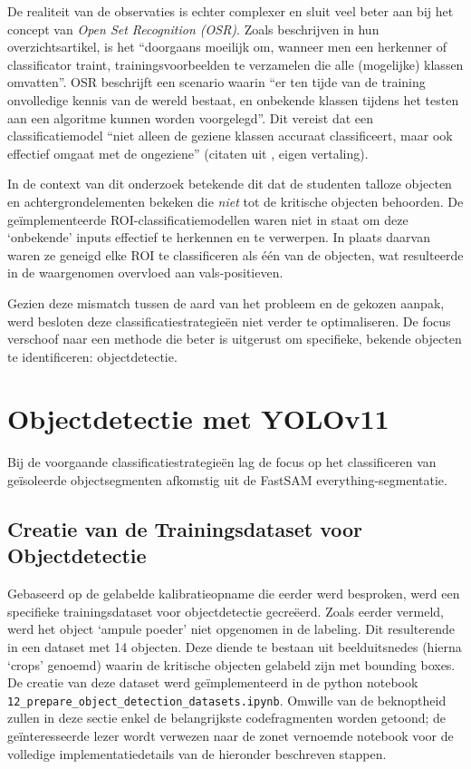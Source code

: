 De realiteit van de observaties is echter complexer en sluit veel beter aan bij het concept van \textit{Open Set Recognition (OSR)}. 
Zoals \textcite{Geng2018} beschrijven in hun overzichtsartikel, is het 
``doorgaans moeilijk om, wanneer men een herkenner of classificator traint, trainingsvoorbeelden te verzamelen die alle (mogelijke) klassen omvatten''.
OSR beschrijft een scenario waarin 
``er ten tijde van de training onvolledige kennis van de wereld bestaat, en onbekende klassen tijdens het testen aan een algoritme kunnen worden voorgelegd''.
Dit vereist dat een classificatiemodel ``niet alleen de geziene klassen accuraat classificeert, maar ook effectief omgaat met de ongeziene'' (citaten uit \textcite{Geng2018}, eigen vertaling).

In de context van dit onderzoek betekende dit dat de studenten talloze objecten en achtergrondelementen bekeken die \textit{niet} tot de kritische objecten behoorden.
De geïmplementeerde ROI-classificatiemodellen waren niet in staat om deze `onbekende' inputs effectief te herkennen en te verwerpen.
In plaats daarvan waren ze geneigd elke ROI te classificeren als één van de objecten, wat resulteerde in de waargenomen overvloed aan vals-positieven.

Gezien deze mismatch tussen de aard van het probleem en de gekozen aanpak, werd besloten deze classificatiestrategieën niet verder te optimaliseren.
De focus verschoof naar een methode die beter is uitgerust om specifieke, bekende objecten te identificeren: objectdetectie.

\section{Objectdetectie met YOLOv11} 

Bij de voorgaande classificatiestrategieën lag de focus op het classificeren van geïsoleerde objectsegmenten afkomstig uit de FastSAM everything-segmentatie.

\subsection{Creatie van de Trainingsdataset voor Objectdetectie}

Gebaseerd op de gelabelde kalibratieopname die eerder werd besproken, werd een specifieke trainingsdataset voor objectdetectie gecreëerd.
Zoals eerder vermeld, werd het object `ampule poeder' niet opgenomen in de labeling. Dit resulterende in een dataset met 14 objecten.
Deze diende te bestaan uit beelduitsnedes (hierna `crops' genoemd) waarin de kritische objecten gelabeld zijn met bounding boxes.
De creatie van deze dataset werd geïmplementeerd in de python notebook \texttt{12\_prepare\_object\_detection\_datasets.ipynb}.
Omwille van de beknoptheid zullen in deze sectie enkel de belangrijkste codefragmenten worden getoond; 
de geïnteresseerde lezer wordt verwezen naar de zonet vernoemde notebook voor de volledige implementatiedetails van de hieronder beschreven stappen.

